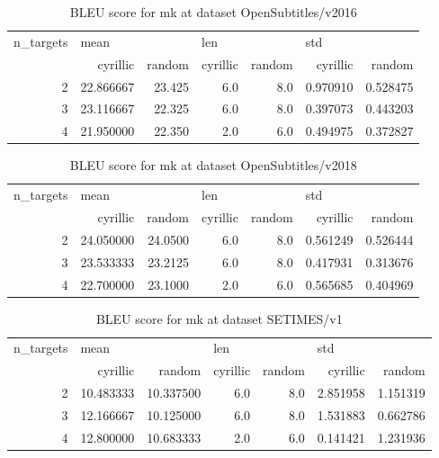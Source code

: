 \begin{table}[h]
\begin{tabular}{rrrrrrr}
\toprule
n\_targets & \multicolumn{2}{l}{mean} & \multicolumn{2}{l}{len} & \multicolumn{2}{l}{std} \\
          &   cyrillic &  random & cyrillic & random &  cyrillic &    random \\
\midrule
        2 &  22.866667 &  23.425 &      6.0 &    8.0 &  0.970910 &  0.528475 \\
        3 &  23.116667 &  22.325 &      6.0 &    8.0 &  0.397073 &  0.443203 \\
        4 &  21.950000 &  22.350 &      2.0 &    6.0 &  0.494975 &  0.372827 \\
\bottomrule
\end{tabular}

\caption{BLEU score for  mk at dataset OpenSubtitles/v2016 }
\label{ table:mk/OpenSubtitles/v2016 }
\end{table}

\begin{table}[h]
\begin{tabular}{rrrrrrr}
\toprule
n\_targets & \multicolumn{2}{l}{mean} & \multicolumn{2}{l}{len} & \multicolumn{2}{l}{std} \\
          &   cyrillic &   random & cyrillic & random &  cyrillic &    random \\
\midrule
        2 &  24.050000 &  24.0500 &      6.0 &    8.0 &  0.561249 &  0.526444 \\
        3 &  23.533333 &  23.2125 &      6.0 &    8.0 &  0.417931 &  0.313676 \\
        4 &  22.700000 &  23.1000 &      2.0 &    6.0 &  0.565685 &  0.404969 \\
\bottomrule
\end{tabular}

\caption{BLEU score for  mk at dataset OpenSubtitles/v2018 }
\label{ table:mk/OpenSubtitles/v2018 }
\end{table}

\begin{table}[h]
\begin{tabular}{rrrrrrr}
\toprule
n\_targets & \multicolumn{2}{l}{mean} & \multicolumn{2}{l}{len} & \multicolumn{2}{l}{std} \\
          &   cyrillic &     random & cyrillic & random &  cyrillic &    random \\
\midrule
        2 &  10.483333 &  10.337500 &      6.0 &    8.0 &  2.851958 &  1.151319 \\
        3 &  12.166667 &  10.125000 &      6.0 &    8.0 &  1.531883 &  0.662786 \\
        4 &  12.800000 &  10.683333 &      2.0 &    6.0 &  0.141421 &  1.231936 \\
\bottomrule
\end{tabular}

\caption{BLEU score for  mk at dataset SETIMES/v1 }
\label{ table:mk/SETIMES/v1 }
\end{table}

